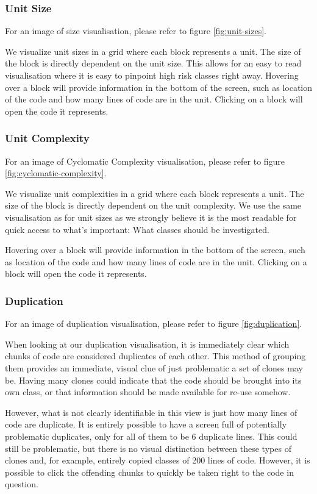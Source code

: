 \documentclass{article}
\begin{document}
\subsubsection{Unit Size}
For an image of size visualisation, please refer to figure \ref{fig:unit-sizes}.

We visualize unit sizes in a grid where each block represents a unit. The size of the block is directly dependent on the unit size. This allows for an easy to read visualisation where it is easy to pinpoint high risk classes right away.
Hovering over a block will provide information in the bottom of the screen, such as location of the code and how many lines of code are in the unit. Clicking on a block will open the code it represents.

\subsubsection{Unit Complexity}
For an image of Cyclomatic Complexity visualisation, please refer to figure \ref{fig:cyclomatic-complexity}.

We visualize unit complexities in a grid where each block represents a unit. The size of the block is directly dependent on the unit complexity. We use the same visualisation as for unit sizes as we strongly believe it is the most readable for quick access to what's important: What classes should be investigated.

Hovering over a block will provide information in the bottom of the screen, such as location of the code and how many lines of code are in the unit. Clicking on a block will open the code it represents.

\subsubsection{Duplication}
For an image of duplication visualisation, please refer to figure \ref{fig:duplication}.

When looking at our duplication visualisation, it is immediately clear which chunks of code are considered duplicates of each other. This method of grouping them provides an immediate, visual clue of just problematic a set of clones may be. Having many clones could indicate that the code should be brought into its own class, or that information should be made available for re-use somehow.

However, what is not clearly identifiable in this view is just how many lines of code are duplicate. It is entirely possible to have a screen full of potentially problematic duplicates, only for all of them to be 6 duplicate lines. This could still be problematic, but there is no visual distinction between these types of clones and, for example, entirely copied classes of 200 lines of code.
However, it is possible to click the offending chunks to quickly be taken right to the code in question.
\end{document}
